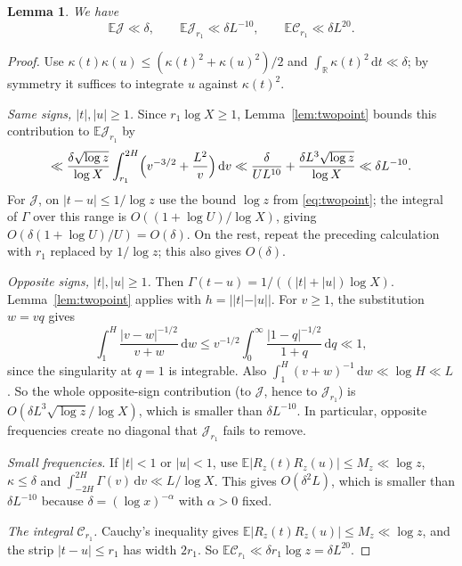 \documentclass[11pt]{amsart}
\newtheorem{lemma}[theorem]{Lemma}
\theoremstyle{remark}
\numberwithin{equation}{section}
\newcommand{\E}{\mathbb{E}}
\newcommand{\R}{\mathbb{R}}
\newcommand{\dd}{\,\mathrm{d}}
\begin{document}
\begin{lemma}\label{lem:JC}
We have
\begin{equation}\label{eq:JC}
\E\mathcal J\ll\delta,\qquad\E\mathcal J_{r_1}\ll\delta L^{-10},\qquad\E\mathcal C_{r_1}\ll\delta L^{20}.
\end{equation}
\end{lemma}

\begin{proof}
Use $\kappa(t)\kappa(u)\le(\kappa(t)^2+\kappa(u)^2)/2$ and $\int_\R\kappa(t)^2\dd t\ll\delta$; by symmetry it suffices to integrate $u$ against $\kappa(t)^2$.

\emph{Same signs, $|t|,|u|\ge1$.} Since $r_1\log X\ge1$, Lemma~\ref{lem:twopoint} bounds this contribution to $\E\mathcal J_{r_1}$ by
\[
\ll\frac{\delta\sqrt{\log z}}{\log X}\int_{r_1}^{2H}\Bigl(v^{-3/2}+\frac{L^2}{v}\Bigr)\dd v\ll\frac{\delta}{UL^{10}}+\frac{\delta L^3\sqrt{\log z}}{\log X}\ll\delta L^{-10}.
\]
For $\mathcal J$, on $|t-u|\le1/\log z$ use the bound $\log z$ from \eqref{eq:twopoint}; the integral of $\Gamma$ over this range is $O((1+\log U)/\log X)$, giving $O(\delta(1+\log U)/U)=O(\delta)$. On the rest, repeat the preceding calculation with $r_1$ replaced by $1/\log z$; this also gives $O(\delta)$.

\emph{Opposite signs, $|t|,|u|\ge1$.} Then $\Gamma(t-u)=1/((|t|+|u|)\log X)$. Lemma~\ref{lem:twopoint} applies with $h=||t|-|u||$. For $v\ge1$, the substitution $w=vq$ gives
\[
\int_1^H\frac{|v-w|^{-1/2}}{v+w}\dd w\le v^{-1/2}\int_0^\infty\frac{|1-q|^{-1/2}}{1+q}\dd q\ll1 ,
\]
since the singularity at $q=1$ is integrable. Also $\int_1^H(v+w)^{-1}\dd w\ll\log H\ll L$. So the whole opposite-sign contribution (to $\mathcal J$, hence to $\mathcal J_{r_1}$) is $O(\delta L^3\sqrt{\log z}/\log X)$, which is smaller than $\delta L^{-10}$. In particular, opposite frequencies create no diagonal that $\mathcal J_{r_1}$ fails to remove.

\emph{Small frequencies.} If $|t|<1$ or $|u|<1$, use $\E|R_z(t)R_z(u)|\le M_z\ll\log z$, $\kappa\le\delta$ and $\int_{-2H}^{2H}\Gamma(v)\dd v\ll L/\log X$. This gives $O(\delta^2L)$, which is smaller than $\delta L^{-10}$ because $\delta=(\log x)^{-\alpha}$ with $\alpha>0$ fixed.

\emph{The integral $\mathcal C_{r_1}$.} Cauchy's inequality gives $\E|R_z(t)R_z(u)|\le M_z\ll\log z$, and the strip $|t-u|\le r_1$ has width $2r_1$. So $\E\mathcal C_{r_1}\ll\delta r_1\log z=\delta L^{20}$.
\end{proof}
\end{document}
